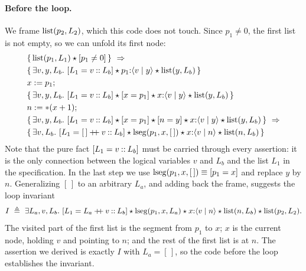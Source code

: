 \paragraph{Before the loop.} We frame $\mathrm{list}(p_2,L_2)$, which this code does not touch. Since
$p_1\neq 0$, the first list is not empty, so we can unfold its first node:
\begin{align*}
  &\{\,\lst(p_1,L_1)\sep\pure{p_1\neq 0}\,\}\ \Rightarrow\\
  &\{\,\exists v,y,L_b.\ \pure{L_1=v\ld L_b}\sep\nd{p_1}{v}{y}\sep\lst(y,L_b)\,\}\\
  &x:=p_1;\\
  &\{\,\exists v,y,L_b.\ \pure{L_1=v\ld L_b}\sep\pure{x=p_1}\sep\nd{x}{v}{y}\sep\lst(y,L_b)\,\}\\
  &n:=\ast(x+1);\\
  &\{\,\exists v,y,L_b.\ \pure{L_1=v\ld L_b}\sep\pure{x=p_1}\sep\pure{n=y}\sep\nd{x}{v}{y}\sep\lst(y,L_b)\,\}\ \Rightarrow\\
  &\{\,\exists v,L_b.\ \pure{L_1=[\,]\app v\ld L_b}\sep\lseg(p_1,x,[\,])\sep\nd{x}{v}{n}\sep\lst(n,L_b)\,\}
\end{align*}
Note that the pure fact $[L_1=v\mathbin{::} L_b]$ must be carried through every assertion: it is the
only connection between the logical variables $v$ and $L_b$ and the list $L_1$ in the
specification. In the last step we use $\mathrm{lseg}(p_1,x,[\,])\equiv[p_1=x]$ and replace $y$ by
$n$. Generalizing $[\,]$ to an arbitrary $L_a$, and adding back the frame, suggests the loop
invariant
\[
  I\ \triangleq\ \exists L_a,v,L_b.\ \pure{L_1=L_a\app v\ld L_b}\sep\lseg(p_1,x,L_a)\sep\nd{x}{v}{n}\sep\lst(n,L_b)\sep\lst(p_2,L_2).
\]
The visited part of the first list is the segment from $p_1$ to $x$; $x$ is the current node,
holding $v$ and pointing to $n$; and the rest of the first list is at $n$. The assertion we derived
is exactly $I$ with $L_a=[\,]$, so the code before the loop establishes the invariant.

